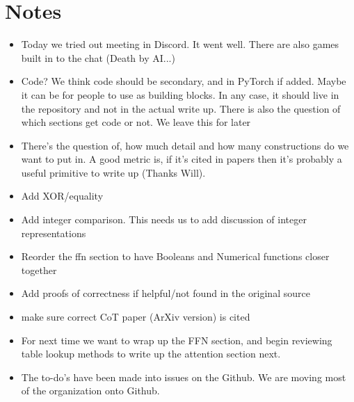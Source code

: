 \documentclass{article}
\begin{document}
\section{Notes}
\begin{itemize}
    \item Today we tried out meeting in Discord. It went well. There are also games built in to the chat (Death by AI...) 
    \item Code? We think code should be secondary, and in PyTorch if added. Maybe it can be for people to use as building blocks. In any case, it should live in the repository and not in the actual write up. There is also the question of which sections get code or not. We leave this for later 
    \item There's the question of, how much detail and how many constructions do we want to put in. A good metric is, if it's cited in papers then it's probably a useful primitive to write up (Thanks Will). 
    \item Add XOR/equality
    \item Add integer comparison. This needs us to add discussion of integer representations
    \item Reorder the ffn section to have Booleans and Numerical functions closer together
    \item Add proofs of correctness if helpful/not found in the original source
    \item make sure correct CoT paper (ArXiv version) is cited
\end{itemize}

\begin{itemize}
    \item For next time we want to wrap up the FFN section, and begin reviewing table lookup methods to write up the attention section next. 
    \item The to-do's have been made into issues on the Github. We are moving most of the organization onto Github.
\end{itemize}



\end{document}
